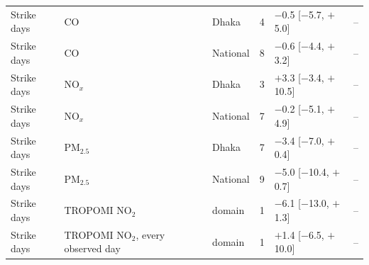 \begin{longtable}{L{2.0cm} L{3.4cm} L{1.5cm} C{0.6cm} C{3.3cm} C{2.4cm}}
Strike days & CO & Dhaka & 4 & $-$0.5 {\scriptsize[$-$5.7, $+$5.0]} & -- \\
Strike days & CO & National & 8 & $-$0.6 {\scriptsize[$-$4.4, $+$3.2]} & -- \\
Strike days & NO$_x$ & Dhaka & 3 & $+$3.3 {\scriptsize[$-$3.4, $+$10.5]} & -- \\
Strike days & NO$_x$ & National & 7 & $-$0.2 {\scriptsize[$-$5.1, $+$4.9]} & -- \\
Strike days & PM$_{2.5}$ & Dhaka & 7 & $-$3.4 {\scriptsize[$-$7.0, $+$0.4]} & -- \\
Strike days & PM$_{2.5}$ & National & 9 & $-$5.0 {\scriptsize[$-$10.4, $+$0.7]} & -- \\
Strike days & TROPOMI NO$_2$ & domain & 1 & $-$6.1 {\scriptsize[$-$13.0, $+$1.3]} & -- \\
Strike days & TROPOMI NO$_2$, every observed day & domain & 1 & $+$1.4 {\scriptsize[$-$6.5, $+$10.0]} & -- \\
\end{longtable}
\endgroup

